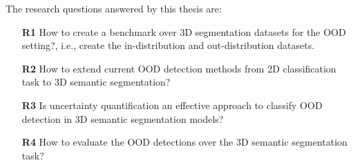 The research questions answered by this thesis are:
\begin{itemize}
    \item[\textbf{R1}] How to create a benchmark over 3D segmentation datasets for the OOD setting?, i.e., create the in-distribution and out-distribution datasets.
    \item[\textbf{R2}] How to extend current OOD detection methods from 2D classification task to 3D semantic segmentation?
    \item[\textbf{R3}] Is uncertainty quantification an effective approach to classify OOD detection in 3D semantic segmentation models?
    \item[\textbf{R4}] How to evaluate the OOD detections over the 3D semantic segmentation task?
\end{itemize}


